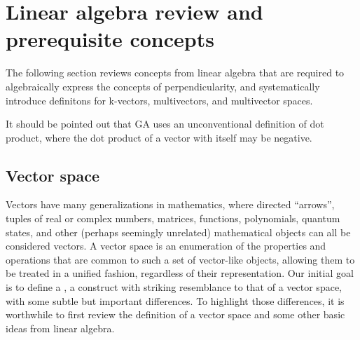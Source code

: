 \section{Linear algebra review and prerequisite concepts}

The following section reviews concepts from linear algebra that are required to algebraically express the concepts of perpendicularity, and systematically introduce definitons for k-vectors, multivectors, and multivector spaces.

It should be pointed out that GA uses an unconventional definition of dot product, where the dot product of a vector with itself may be negative.

\subsection{Vector space}

Vectors have many generalizations in mathematics, where directed ``arrows'', tuples of real or complex numbers, matrices, functions, polynomials, quantum states, and other
(perhaps seemingly unrelated)
mathematical objects
can all be considered vectors.
A vector space is an enumeration of the properties and operations that are common to such a set of
vector-like objects, allowing them to be treated in a unified fashion, regardless of their representation.
Our initial goal is to define a , a construct with
striking resemblance to that of a vector space, with some subtle but important differences.
To highlight those differences, it is worthwhile to first review the definition of a vector space and some other basic ideas from linear algebra.

